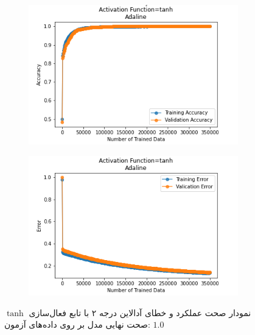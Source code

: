 \documentclass[12pt, a4paper]{article}
\begin{document}
\begin{figure}[h]
    \begin{subfigure}{0.45\linewidth}
        \centering
        \includegraphics[width=\linewidth]{images/6/adaline/activation_func/tanh_acc.png}
    \end{subfigure}
    \hfil
    \begin{subfigure}{0.45\linewidth}
        \centering
        \includegraphics[width=\linewidth]{images/6/adaline/activation_func/tanh_error.png}
    \end{subfigure}
    \caption{نمودار صحت عملکرد‌ و خطای آدالاین درجه ۲ با تابع فعال‌سازی $\tanh$
    \newline
    صحت نهایی مدل بر روی داده‌های آزمون: $1.0$}
\end{figure}

\vspace{0.5cm}
\end{document}
